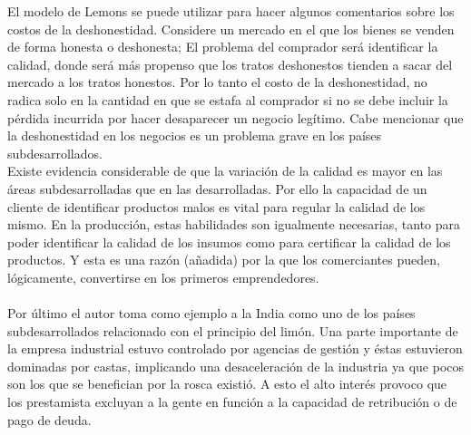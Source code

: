 \begin{multicols}{2}
El modelo de Lemons se puede utilizar para hacer algunos comentarios sobre los costos de la deshonestidad. Considere un mercado en el que los bienes se venden de forma honesta o deshonesta; El problema del comprador será identificar la calidad, donde será más propenso  que los tratos deshonestos tienden a sacar del mercado a los tratos honestos. Por lo tanto  el costo de la deshonestidad, no radica solo en la cantidad en que se estafa al comprador si no se debe incluir la pérdida incurrida por hacer desaparecer un negocio legítimo. Cabe mencionar que la deshonestidad en los negocios es un problema grave en los países subdesarrollados.\\ 
Existe evidencia considerable de que la variación de la calidad es mayor en las áreas subdesarrolladas que en las desarrolladas. Por ello la capacidad de un cliente de identificar productos malos es vital para regular la calidad de los mismo. En la producción, estas habilidades son igualmente necesarias, tanto para poder identificar la calidad de los insumos como para certificar la calidad de los productos. Y esta es una razón (añadida) por la que los comerciantes pueden, lógicamente, convertirse en los primeros emprendedores. \\\\
Por último el autor toma como ejemplo a la India como uno de los  países subdesarrollados relacionado con el principio del limón. Una parte importante de la empresa industrial estuvo controlado por agencias de gestión y éstas estuvieron dominadas por castas, implicando una desaceleración de la industria ya que pocos son los que se benefician por la rosca existió. A esto el alto interés provoco que los prestamista excluyan a la gente en función a la capacidad de retribución o de pago de deuda.\\\\ 


 \end{multicols}
